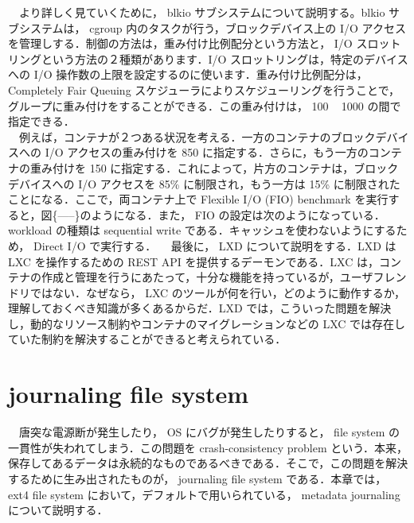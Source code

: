 \documentclass[graduation-thesis]{jsarticle}
\begin{document}
　より詳しく見ていくために， blkio サブシステムについて説明する。blkio サブシステムは， cgroup 内のタスクが行う，ブロックデバイス上の I/O アクセスを管理しする．制御の方法は，重み付け比例配分という方法と， I/O スロットリングという方法の２種類があります．I/O スロットリングは，特定のデバイスへの I/O 操作数の上限を設定するのに使います．重み付け比例配分は， Completely Fair Queuing スケジューラによりスケジューリングを行うことで，グループに重み付けをすることができる．この重み付けは， 100 ~ 1000 の間で指定できる．\\
　例えば，コンテナが２つある状況を考える．一方のコンテナのブロックデバイスへの I/O アクセスの重み付けを 850 に指定する．さらに，もう一方のコンテナの重み付けを 150 に指定する．これによって，片方のコンテナは，ブロックデバイスへの I/O アクセスを 85\% に制限され，もう一方は 15\% に制限されたことになる．ここで，両コンテナ上で Flexible I/O (FIO) benchmark を実行すると，図\{-----\}のようになる．また， FIO の設定は次のようになっている．workload の種類は sequential write である．キャッシュを使わないようにするため， Direct I/O で実行する．
　最後に， LXD について説明をする．LXD は LXC を操作するための REST API を提供するデーモンである．LXC は，コンテナの作成と管理を行うにあたって，十分な機能を持っているが，ユーザフレンドリではない．なぜなら， LXC のツールが何を行い，どのように動作するか，理解しておくべき知識が多くあるからだ．LXD では，こういった問題を解決し，動的なリソース制約やコンテナのマイグレーションなどの LXC では存在していた制約を解決することができると考えられている．
　
\clearpage
\section{journaling file system}
\label{sec:journaling}
　唐突な電源断が発生したり， OS にバグが発生したりすると， file system の一貫性が失われてしまう．この問題を crash-consistency problem という．本来，保存してあるデータは永続的なものであるべきである．そこで，この問題を解決するために生み出されたものが， journaling file system である．本章では， ext4 file system において，デフォルトで用いられている， metadata journaling について説明する．
\end{document}
